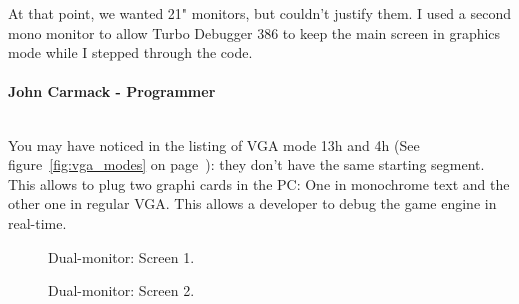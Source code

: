 \documentclass[book.tex]{subfiles}
\begin{document}
\begin{fancyquotes}
At that point, we wanted 21" monitors, but couldn't justify them.  I used a second mono monitor to allow Turbo Debugger 386 to keep the main screen in graphics mode while I stepped through the code.\\
 \\
\textbf{John Carmack - Programmer}
\end{fancyquotes}
\\
You may have noticed in the listing of VGA mode 13h and 4h (See figure~\ref{fig:vga_modes} on page~\pageref{fig:vga_modes}): they don't have the same starting segment. This allows to plug two graphi cards in the PC: One in monochrome text and the other one in regular VGA. This allows a developer to debug the game engine in real-time.\\
\begin{figure}[H]
\centering
\caption{Dual-monitor: Screen 1.}
\label{fig:dm1}
\end{figure}

\begin{figure}[H]
\centering
\caption{Dual-monitor: Screen 2.}
\label{fig:dm1}
\end{figure}
\end{document}
